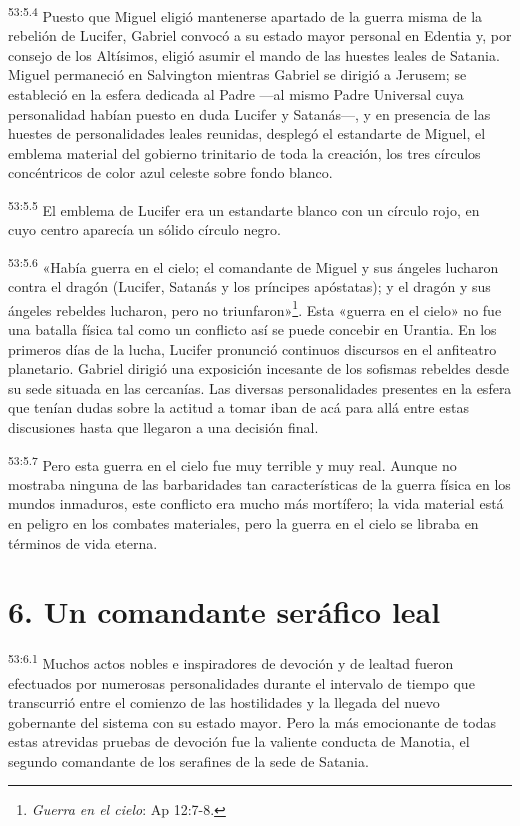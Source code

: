 \par
\textsuperscript{53:5.4} Puesto que Miguel eligió mantenerse apartado de la guerra misma de la rebelión de Lucifer, Gabriel convocó a su estado mayor personal en Edentia y, por consejo de los Altísimos, eligió asumir el mando de las huestes leales de Satania. Miguel permaneció en Salvington mientras Gabriel se dirigió a Jerusem; se estableció en la esfera dedicada al Padre ---al mismo Padre Universal cuya personalidad habían puesto en duda Lucifer y Satanás---, y en presencia de las huestes de personalidades leales reunidas, desplegó el estandarte de Miguel, el emblema material del gobierno trinitario de toda la creación, los tres círculos concéntricos de color azul celeste sobre fondo blanco.

\par
\textsuperscript{53:5.5} El emblema de Lucifer era un estandarte blanco con un círculo rojo, en cuyo centro aparecía un sólido círculo negro.

\par
\textsuperscript{53:5.6} «Había guerra en el cielo; el comandante de Miguel y sus ángeles lucharon contra el dragón (Lucifer, Satanás y los príncipes apóstatas); y el dragón y sus ángeles rebeldes lucharon, pero no triunfaron»\footnote{\textit{Guerra en el cielo}: Ap 12:7-8.}. Esta «guerra en el cielo» no fue una batalla física tal como un conflicto así se puede concebir en Urantia. En los primeros días de la lucha, Lucifer pronunció continuos discursos en el anfiteatro planetario. Gabriel dirigió una exposición incesante de los sofismas rebeldes desde su sede situada en las cercanías. Las diversas personalidades presentes en la esfera que tenían dudas sobre la actitud a tomar iban de acá para allá entre estas discusiones hasta que llegaron a una decisión final.

\par
\textsuperscript{53:5.7} Pero esta guerra en el cielo fue muy terrible y muy real. Aunque no mostraba ninguna de las barbaridades tan características de la guerra física en los mundos inmaduros, este conflicto era mucho más mortífero; la vida material está en peligro en los combates materiales, pero la guerra en el cielo se libraba en términos de vida eterna.

\section*{6. Un comandante seráfico leal}
\par
\textsuperscript{53:6.1} Muchos actos nobles e inspiradores de devoción y de lealtad fueron efectuados por numerosas personalidades durante el intervalo de tiempo que transcurrió entre el comienzo de las hostilidades y la llegada del nuevo gobernante del sistema con su estado mayor. Pero la más emocionante de todas estas atrevidas pruebas de devoción fue la valiente conducta de Manotia, el segundo comandante de los serafines de la sede de Satania.

